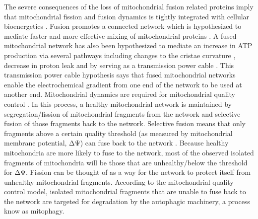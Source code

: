 The severe consequences of the loss of mitochondrial fusion related proteins imply that mitochondrial fission and fusion dynamics is tightly integrated with cellular bioenergetics \cite{sauvanet_energetic_2010}. Fusion promotes a connected network which is hypothesized to mediate faster and more effective mixing of mitochondrial proteins \cite{busch_quality_2014,wilkens_restricted_2013}. A fused mitochondrial network has also been hypothesized to mediate an increase in ATP production via several pathways including changes to the cristae curvature \cite{patten_opa1-dependent_2014}, decrease in proton leak \cite{gnaiger_mitochondrial_2002} and by serving as a transmission power cable \cite{amchenkova_coupling_1988}. This transmission power cable hypothesis says that fused mitochondrial networks enable the electrochemical gradient from one end of the network to be used at another end. Mitochondrial dynamics are required for mitochondrial quality control \cite{twig_fission_2008}. In this process, a healthy mitochondrial network is maintained by segregation/fission of mitochondrial fragments from the network and selective fusion of those fragments back to the network. Selective fusion means that only fragments above a certain quality threshold (as measured by mitochondrial membrane potential, ΔΨ) can fuse back to the network \cite{legros_mitochondrial_2002,meeusen_mitochondrial_2004}. Because healthy mitochondria are more likely to fuse to the network, most of the observed isolated fragments of mitochondria will be those that are unhealthy/below the threshold for ΔΨ. Fission can be thought of as a way for the network to protect itself from unhealthy mitochondrial fragments. According to the mitochondrial quality control model, isolated mitochondrial fragments that are unable to fuse back to the network are targeted for degradation by the autophagic machinery, a process know as mitophagy.
%
